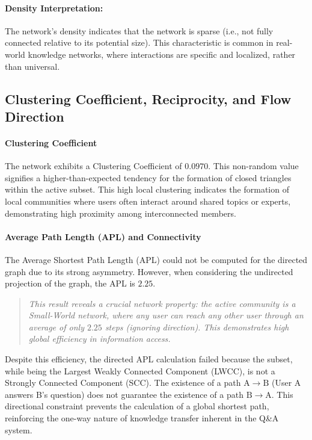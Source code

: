 \documentclass[sigplan]{acmart}
\begin{document}
\paragraph{Density Interpretation:}
The network's density indicates that the network is sparse (i.e., not fully connected relative to its potential size). This characteristic is common in real-world knowledge networks, where interactions are specific and localized, rather than universal.

\subsection{Clustering Coefficient, Reciprocity, and Flow Direction}

\paragraph{Clustering Coefficient}
The network exhibits a Clustering Coefficient of $\mathbf{0.0970}$. This non-random value signifies a higher-than-expected tendency for the formation of closed triangles within the active subset. This high local clustering indicates the formation of local communities where users often interact around shared topics or experts, demonstrating high proximity among interconnected members.

\paragraph{Average Path Length (APL) and Connectivity}
The Average Shortest Path Length (APL) could not be computed for the directed graph due to its strong asymmetry. However, when considering the undirected projection of the graph, the APL is $\mathbf{2.25}$.
\begin{quote}
    \textit{This result reveals a crucial network property: the active community is a Small-World network, where any user can reach any other user through an average of only $\mathbf{2.25}$ steps (ignoring direction). This demonstrates high global efficiency in information access.} 
\end{quote}
Despite this efficiency, the directed APL calculation failed because the subset, while being the Largest Weakly Connected Component (LWCC), is not a Strongly Connected Component (SCC). The existence of a path $\mathrm{A} \to \mathrm{B}$ (User A answers B's question) does not guarantee the existence of a path $\mathrm{B} \to \mathrm{A}$. This directional constraint prevents the calculation of a global shortest path, reinforcing the one-way nature of knowledge transfer inherent in the Q\&A system.
\end{document}
